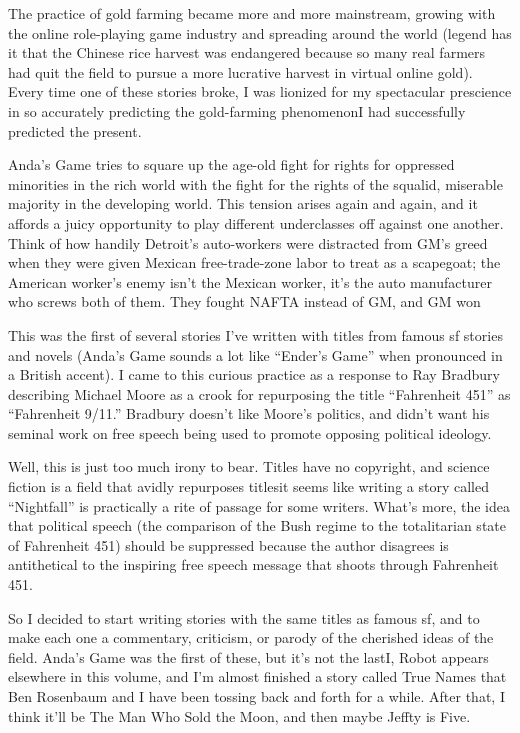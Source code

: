 The practice of gold farming became more and more mainstream,
growing with the online role-playing game industry and spreading
around the world (legend has it that the Chinese rice harvest was
endangered because so many real farmers had quit the field to
pursue a more lucrative harvest in virtual online gold). Every time
one of these stories broke, I was lionized for my spectacular
prescience in so accurately predicting the gold-farming
phenomenon\dash{}I had successfully predicted the present.

Anda’s Game tries to square up the age-old fight for rights for
oppressed minorities in the rich world with the fight for the
rights of the squalid, miserable majority in the developing world.
This tension arises again and again, and it affords a juicy
opportunity to play different underclasses off against one another.
Think of how handily Detroit’s auto-workers were distracted from
GM’s greed when they were given Mexican free-trade-zone labor to
treat as a scapegoat; the American worker’s enemy isn’t the Mexican
worker, it’s the auto manufacturer who screws both of them. They
fought NAFTA instead of GM, and GM won

This was the first of several stories I’ve written with titles from
famous sf stories and novels (Anda’s Game sounds a lot like
“Ender’s Game” when pronounced in a British accent). I came to this
curious practice as a response to Ray Bradbury describing Michael
Moore as a crook for repurposing the title “Fahrenheit 451” as
“Fahrenheit 9/11.” Bradbury doesn’t like Moore’s politics, and
didn’t want his seminal work on free speech being used to promote
opposing political ideology.

Well, this is just too much irony to bear. Titles have no
copyright, and science fiction is a field that avidly repurposes
titles\dash{}it seems like writing a story called “Nightfall” is
practically a rite of passage for some writers. What’s more, the
idea that political speech (the comparison of the Bush regime to
the totalitarian state of Fahrenheit 451) should be suppressed
because the author disagrees is antithetical to the inspiring free
speech message that shoots through Fahrenheit 451.

So I decided to start writing stories with the same titles as
famous sf, and to make each one a commentary, criticism, or parody
of the cherished ideas of the field. Anda’s Game was the first of
these, but it’s not the last\dash{}I, Robot appears elsewhere in this
volume, and I’m almost finished a story called True Names that Ben
Rosenbaum and I have been tossing back and forth for a while. After
that, I think it’ll be The Man Who Sold the Moon, and then maybe
Jeffty is Five.

